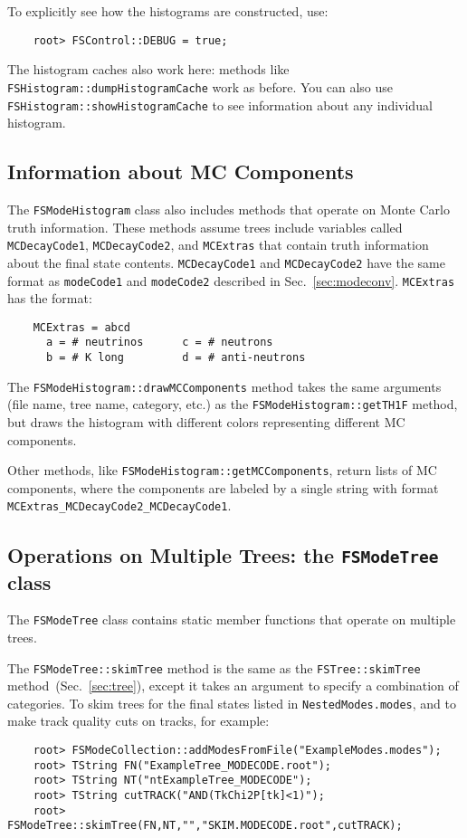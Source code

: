 \documentclass[11pt]{article}
\begin{document}
To explicitly see how the histograms are constructed, use:
\begin{verbatim}
    root> FSControl::DEBUG = true;
\end{verbatim}

The histogram caches also work here:  methods like {\tt FSHistogram::dumpHistogramCache} work as before.
You can also use {\tt FSHistogram::showHistogramCache} to see information about any individual histogram.

\subsection{Information about MC Components}
\label{sec:mccomponents}

The {\tt FSModeHistogram} class also includes methods that operate on Monte Carlo truth information.  These methods assume trees include variables called {\tt MCDecayCode1}, {\tt MCDecayCode2}, and {\tt MCExtras} that contain truth information about the final state contents.  {\tt MCDecayCode1} and {\tt MCDecayCode2} have the same format as {\tt modeCode1} and {\tt modeCode2} described in Sec.~\ref{sec:modeconv}. {\tt MCExtras} has the format:
\begin{verbatim}
    MCExtras = abcd
      a = # neutrinos      c = # neutrons    
      b = # K long         d = # anti-neutrons
\end{verbatim}

The {\tt FSModeHistogram::drawMCComponents} method takes the same arguments (file name, tree name, category, etc.) as the {\tt FSModeHistogram::getTH1F} method, but draws the histogram with different colors representing different MC components.  

Other methods, like {\tt FSModeHistogram::getMCComponents}, return lists of MC components, where the components are labeled by a single string with format {\tt  MCExtras\_MCDecayCode2\_MCDecayCode1}.

\subsection{Operations on Multiple Trees: the {\tt FSModeTree} class}
\label{sec:modetree}

The {\tt FSModeTree} class contains static member functions that operate on multiple trees.

The {\tt FSModeTree::skimTree} method is the same as the {\tt FSTree::skimTree} method~(Sec.~\ref{sec:tree}), except it takes an argument to specify a combination of categories.  To skim trees for the final states listed in {\tt NestedModes.modes}, and to make track quality cuts on tracks, for example:
\begin{verbatim}
    root> FSModeCollection::addModesFromFile("ExampleModes.modes");
    root> TString FN("ExampleTree_MODECODE.root");  
    root> TString NT("ntExampleTree_MODECODE");
    root> TString cutTRACK("AND(TkChi2P[tk]<1)");
    root> FSModeTree::skimTree(FN,NT,"","SKIM.MODECODE.root",cutTRACK);
\end{verbatim}
\end{document}
